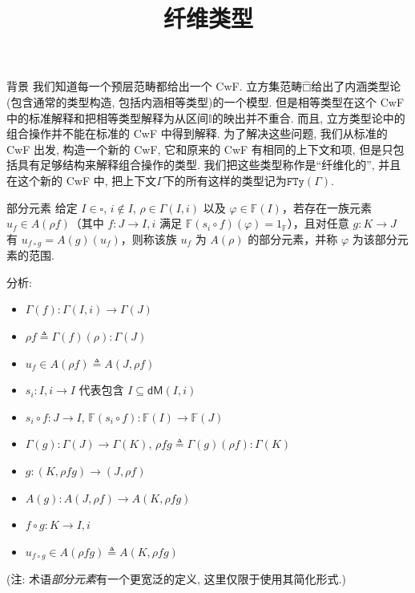 \documentclass[aspectratio=169,xcolor=dvipsnames]{beamer}
\title{纤维类型}
\date{}
\newcommand\bbI{\mathbb{I}}
\newcommand\bbF{\mathbb{F}}
\newcommand\FTy{\mathtt{FTy}}
\newcommand\dM{\mathsf{dM}}
\newcommand\Set{\mathbf{Set}}
\newcommand\cubicalsets{\widehat{□}}
\begin{document}
\begin{frame}
    \titlepage
\end{frame}

\begin{frame}{背景}
我们知道每一个预层范畴都给出一个 CwF. 立方集范畴$\cubicalsets$给出了内涵类型论(包含通常的类型构造, 包括内涵相等类型)的一个模型. 但是相等类型在这个 CwF 中的标准解释和把相等类型解释为从区间$\bbI$的映出并不重合. 而且, 立方类型论中的组合操作并不能在标准的 CwF 中得到解释. 为了解决这些问题, 我们从标准的 CwF 出发, 构造一个新的 CwF, 它和原来的 CwF 有相同的上下文和项, 但是只包括具有足够结构来解释组合操作的类型. 我们把这些类型称作是“纤维化的”, 并且在这个新的 CwF 中, 把上下文$\Gamma$下的所有这样的类型记为$\FTy(\Gamma)$.
\end{frame}

\begin{frame}[shrink]{部分元素}
给定 $I \in \square$, $i \notin I$, $\rho \in \Gamma(I, i)$ 以及 $\varphi \in \bbF(I)$，若存在一族元素 $u_f \in A(\rho f)$（其中 $f : J \to I,i$ 满足 $ \bbF(s_i \circ f)(\varphi) = 1_{\bbF} $），且对任意 $ g : K \to J $ 有 $u_{f \circ g} = A(g)(u_f)$，则称该族 $u_f$ 为 $A(\rho)$ 的部分元素，并称 $\varphi$ 为该部分元素的范围.

  分析:
  \begin{itemize}
    \item $\Gamma(f) : \Gamma(I,i)\to\Gamma(J)$
    \item $\rho f\triangleq\Gamma(f)(\rho):\Gamma(J)$
    \item $u_f\in A(\rho f)\triangleq A(J,\rho f)$
    \item $s_i:I,i\to I$ 代表包含 $I\subseteq\dM(I,i)$
    \item $s_i\circ f : J \to I$, $\bbF(s_i\circ f) : \bbF(I) \to \bbF(J)$
    \item $\Gamma(g):\Gamma(J)\to\Gamma(K)$, $\rho f g \triangleq\Gamma(g)(\rho f):\Gamma(K)$
    \item $g : (K,\rho f g) \to (J,\rho f)$
    \item $A(g) : A(J,\rho f) \to A(K,\rho f g)$
    \item $f\circ g:K\to I,i$
    \item $u_{f\circ g} \in A(\rho f g) \triangleq A(K,\rho f g)$
  \end{itemize}
  (注: 术语\emph{部分元素}有一个更宽泛的定义, 这里仅限于使用其简化形式.)
\end{frame}
\end{document}
